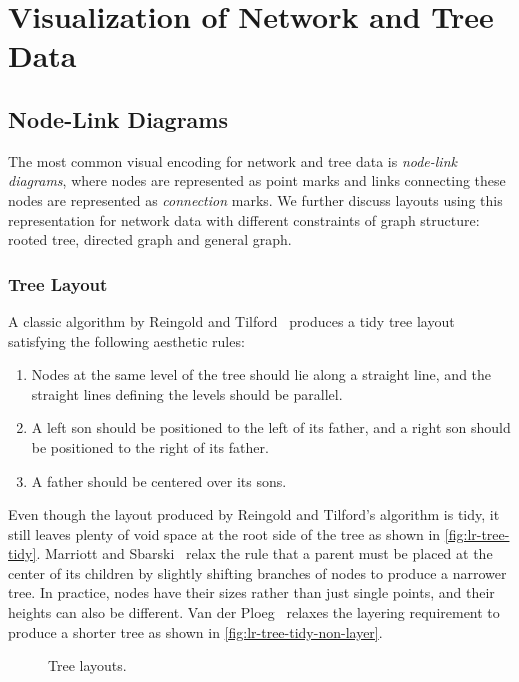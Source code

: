 \section{Visualization of Network and Tree Data}

\subsection{Node-Link Diagrams}
The most common visual encoding for network and tree data is \emph{node-link diagrams}, where nodes are represented as point marks and links connecting these nodes are represented as \emph{connection} marks. We further discuss layouts using this representation for network data with different constraints of graph structure: rooted tree, directed graph and general graph.

\subsubsection{Tree Layout}
A classic algorithm by Reingold and Tilford~\cite{Reingold1981} produces a tidy tree layout satisfying the following aesthetic rules:
\begin{enumerate}
	\item Nodes at the same level of the tree should lie along a straight line, and the straight lines defining the levels should be parallel.
	\item A left son should be positioned to the left of its father, and a right son should be positioned to the right of its father.
	\item A father should be centered over its sons.
\end{enumerate} 

Even though the layout produced by Reingold and Tilford's algorithm is tidy, it still leaves plenty of void space at the root side of the tree as shown in \autoref{fig:lr-tree-tidy}. Marriott and Sbarski~\cite{Marriott2007} relax the rule that a parent must be placed at the center of its children by slightly shifting branches of nodes to produce a narrower tree. In practice, nodes have their sizes rather than just single points, and their heights can also be different. Van der Ploeg~\cite{VanderPloeg2014} relaxes the layering requirement to produce a shorter tree as shown in \autoref{fig:lr-tree-tidy-non-layer}.

\begin{figure}[!htb]
\centering
{}
\hfill
{}
\caption{Tree layouts.}
\end{figure}

